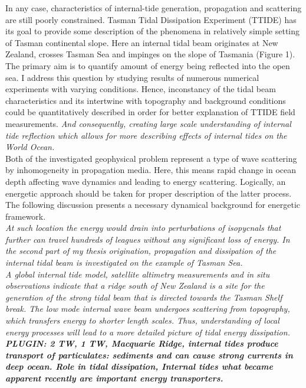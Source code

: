 In any case, characteristics of internal-tide generation, propagation and scattering are still poorly constrained. Tasman Tidal Dissipation Experiment (TTIDE) has its goal to provide some description of the phenomena in relatively simple setting of Tasman continental slope. Here an internal tidal beam originates at New Zealand, crosses Tasman Sea and impinges on the slope of Tasmania (Figure 1). The primary aim is to quantify amount of energy being reflected into the open sea. I address this question by studying results of numerous numerical experiments with varying conditions. Hence, inconstancy of the tidal beam characteristics and its intertwine with topography and background conditions could be quantitatively described in order for better explanation of TTIDE field measurements.\textit{ And consequently, creating large scale understanding of internal tide reflection which allows for more describing effects of internal tides on the World Ocean.}\\
Both of the investigated geophysical problem represent a type of wave scattering by inhomogeneity in propagation media. Here, this means rapid change in ocean depth affecting wave dynamics and leading to energy scattering. Logically, an energetic approach should be taken for proper description of the latter process. The following discussion presents a  necessary dynamical background for energetic framework.\\
\textit{At such location the energy would drain into perturbations of isopycnals that further can travel hundreds of  leagues without any significant loss of energy. In the second part of my thesis origination, propagation and dissipation of the internal tidal beam is investigated on the example of Tasman Sea.\\
A global internal tide model, satellite altimetry measurements and in situ observations indicate that a ridge south of New Zealand is a site for the generation of the strong tidal beam that is directed towards the Tasman Shelf break. The low mode internal wave beam undergoes scattering from topography, which transfers energy to shorter length scales. Thus, understanding of local energy processes will lead to a more detailed picture of tidal energy dissipation.\\
\textbf{PLUGIN: 2 TW, 1 TW, Macquarie Ridge, internal tides produce transport of particulates: sediments and can cause strong currents in deep ocean. Role in tidal dissipation, Internal tides what became apparent recently are important energy transporters.}
}
\newpage
